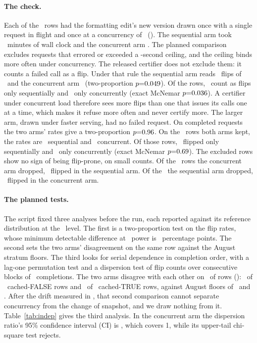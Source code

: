 \paragraph{The check.} Each of the \indepN\ rows had the formatting
edit's new version drawn once with a single request in flight and once
at a concurrency of \indepConcurrency\ (). The
sequential arm took \indepSeqMinutes\ minutes of wall clock and the
concurrent arm \indepConcMinutes. The planned comparison excludes
requests that errored or exceeded a \indepCallCeiling-second ceiling,
and the ceiling binds more often under concurrency. The released
certifier does not exclude them: it counts a failed call as a flip.
Under that rule the sequential arm reads \indepSeqFailCount\ flips of
\indepN\ and the concurrent arm \indepConcFailCount\ (two-proportion
$p{=}0.049$). Of the rows, \indepFailOnlySeq\ count as flips only
sequentially and \indepFailOnlyConc\ only concurrently (exact McNemar
$p{=}0.036$). A certifier under concurrent load therefore
sees more flips than one that issues its calls one at a time, which
makes it refuse more often and never certify more. The larger arm,
drawn under faster serving, had no failed request. On completed
requests the two arms' rates give a two-proportion $p{=}0.96$.
On the \indepBothRows\ rows both arms kept,
the rates are \indepBothSeqRate\ sequential and \indepBothConcRate\
concurrent. Of those rows, \indepOnlySeqFlips\ flipped only sequentially
and \indepOnlyConcFlips\ only concurrently (exact McNemar
$p{=}0.69$). The excluded rows show no sign of being
flip-prone, on small counts. Of the \indepConcDroppedRows\ rows the
concurrent arm dropped, \indepConcDroppedSeqFlips\ flipped in the
sequential arm. Of the \indepSeqDroppedRows\ the sequential arm
dropped, \indepSeqDroppedConcFlips\ flipped in the concurrent arm.

\keeprunin
\paragraph{The planned tests.} The script fixed three analyses before
the run, each reported against its reference distribution at the
\indepLevel\ level. The first is a two-proportion test on the flip
rates, whose minimum detectable difference at \indepPowerTarget\ power
is \indepMdd\ percentage points. The second sets the two arms'
disagreement on the same row against the August stratum floors. The
third looks for serial dependence in completion order, with a lag-one
permutation test and a dispersion test of flip counts over consecutive
blocks of \indepBlockSize\ completions. The two arms disagree with each
other on
\indepAgreeDisagree\ of rows (\indepAgreeCi): \indepAgreeFalse\ of
\indepAgreeFalseN\ cached-FALSE rows and \indepAgreeTrue\ of
\indepAgreeTrueN\ cached-TRUE rows, against August floors of
\floorFalseStratum\ and \floorTrueStratum. After the drift measured
in \secref{sec:exp-deploy}, that second comparison cannot separate concurrency from the
change of snapshot, and we draw nothing from it.
Table~\ref{tab:indep} gives the third analysis. In the concurrent arm
the dispersion ratio's 95\% confidence interval (CI) is
\indepConcDispersionCi, which covers
1, while its upper-tail chi-square test rejects.

